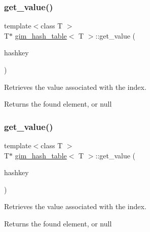 \subsubsection{\texorpdfstring{get\+\_\+value()}{get\_value()}\hspace{0.1cm}{\footnotesize\ttfamily [1/2]}}
{\footnotesize\ttfamily template$<$class T $>$ \\
T$\ast$ \hyperlink{classgim__hash__table}{gim\+\_\+hash\+\_\+table}$<$ T $>$\+::get\+\_\+value (\begin{DoxyParamCaption}\item[{G\+U\+I\+NT}]{hashkey }\end{DoxyParamCaption})\hspace{0.3cm}{\ttfamily [inline]}}



Retrieves the value associated with the index. 

\begin{DoxyReturn}{Returns}
the found element, or null 
\end{DoxyReturn}
\mbox{\label{classgim__hash__table_a40b5c46a0117da3948cd1b093f185321}} 
\subsubsection{\texorpdfstring{get\+\_\+value()}{get\_value()}\hspace{0.1cm}{\footnotesize\ttfamily [2/2]}}
{\footnotesize\ttfamily template$<$class T $>$ \\
T$\ast$ \hyperlink{classgim__hash__table}{gim\+\_\+hash\+\_\+table}$<$ T $>$\+::get\+\_\+value (\begin{DoxyParamCaption}\item[{G\+U\+I\+NT}]{hashkey }\end{DoxyParamCaption})\hspace{0.3cm}{\ttfamily [inline]}}



Retrieves the value associated with the index. 

\begin{DoxyReturn}{Returns}
the found element, or null 
\end{DoxyReturn}
\mbox{\label{classgim__hash__table_aff0e9bdb5bd6aacf9272db6789c514f7}} 
